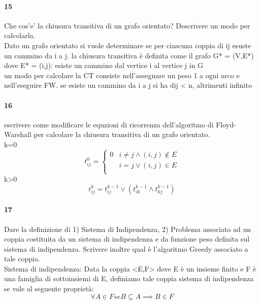 \documentclass[12pt, a4paper, openany]{book}
\begin{document}
\paragraph{15}
Che cos’e’ la chiusura transitiva di un grafo orientato? Descrivere un modo
per calcolarla.\\
Dato un grafo orientato si vuole determinare se per ciascuna coppia di ij esuste un cammino da i a j. la chiusura transitiva è definita come il grafo G* = (V,E*) dove E* = {(i,j): esiste un cammino dal vertice i al vertice j in G}\\
un modo per calcolare la CT consiste nell'assegnare un peso 1 a ogni arco e nell'eseguire FW. se esiste un cammino da i a j si ha dij < n, altrimenti infinito
\paragraph{16}
escrivere come modificare le equzioni di ricorrenza dell’algoritmo di Floyd-Warshall per calcolare la chiusura transitiva di un grafo orientato.\\
k=0
\begin{equation*}
	t_{ij}^0 = \begin{cases}
		0  & i \neq j \land (i,j) \notin E \\
		\  & i = j \lor (i,j) \in E        \\
	\end{cases}
\end{equation*}
k>0
\begin{equation*}
	t_{ij}^k = t_{ij}^{k-1} \lor (t_{ik}^{k-1} \land t_{kj}^{k-1})
\end{equation*}

\paragraph{17}
Dare la definizione di 1) Sistema di Indipendenza, 2) Problema associato ad
un coppia costituita da un sistema di indipendenza e da funzione peso definita
sul sistema di indipendenza. Scrivere inoltre qual è l’algoritmo Greedy
associato a tale coppia.\\
Sistema di indipendenza: Data la coppia <E,F> dove E è un insieme finito e F è una famiglia di sottoinsiemi di E, definiamo tale coppia sistema di indipendenza se vale al seguente proprietà:
\begin{equation*}
	\forall A \in F se B \subseteq A \implies B \in F
\end{equation*}
\end{document}
